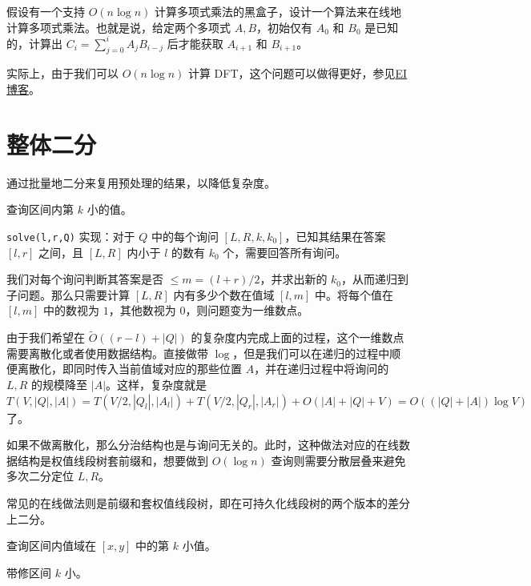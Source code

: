 \begin{exercise}[P4093]
\end{exercise}

\begin{exercise}
    假设有一个支持 $O(n\log n)$ 计算多项式乘法的黑盒子，设计一个算法来在线地计算多项式乘法。也就是说，给定两个多项式 $A,B$，初始仅有 $A_0$ 和 $B_0$ 是已知的，计算出 $C_i=\sum_{j=0}^i A_j B_{i-j}$ 后才能获取 $A_{i+1}$ 和 $B_{i+1}$。
\end{exercise}
\begin{remark}
    实际上，由于我们可以 $O(n\log n)$ 计算 DFT，这个问题可以做得更好，参见\href{https://www.cnblogs.com/Elegia/p/vDH07-relaxed-multiplication.html}{EI 博客}。
\end{remark}

\section{整体二分}

通过批量地二分来复用预处理的结果，以降低复杂度。

\begin{example}[区间 kth]
    查询区间内第 $k$ 小的值。
\end{example}
\begin{solution}
    \texttt{solve(l,r,Q)} 实现：对于 $Q$ 中的每个询问 $[L,R,k,k_0]$，已知其结果在答案 $[l,r]$ 之间，且 $[L,R]$ 内小于 $l$ 的数有 $k_0$ 个，需要回答所有询问。
    
    我们对每个询问判断其答案是否 $\le m=(l+r)/2$，并求出新的 $k_0$，从而递归到子问题。那么只需要计算 $[L,R]$ 内有多少个数在值域 $[l,m]$ 中。将每个值在 $[l,m]$ 中的数视为 $1$，其他数视为 $0$，则问题变为一维数点。
    
    由于我们希望在 $\tilde O((r-l)+|Q|)$ 的复杂度内完成上面的过程，这个一维数点需要离散化或者使用数据结构。直接做带 $\log$，但是我们可以在递归的过程中顺便离散化，即同时传入当前值域对应的那些位置 $A$，并在递归过程中将询问的 $L,R$ 的规模降至 $|A|$。这样，复杂度就是 $T(V,|Q|,|A|)=T(V/2,|Q_l|,|A_l|)+T(V/2,|Q_r|,|A_r|)+O(|A|+|Q|+V)=O((|Q|+|A|)\log V)$ 了。
\end{solution}
\begin{remark}
    如果不做离散化，那么分治结构也是与询问无关的。此时，这种做法对应的在线数据结构是权值线段树套前缀和，想要做到 $O(\log n)$ 查询则需要分散层叠来避免多次二分定位 $L,R$。

    常见的在线做法则是前缀和套权值线段树，即在可持久化线段树的两个版本的差分上二分。
\end{remark}
\begin{exercise}
    查询区间内值域在 $[x,y]$ 中的第 $k$ 小值。
\end{exercise}
\begin{exercise}
    带修区间 $k$ 小。
\end{exercise}

